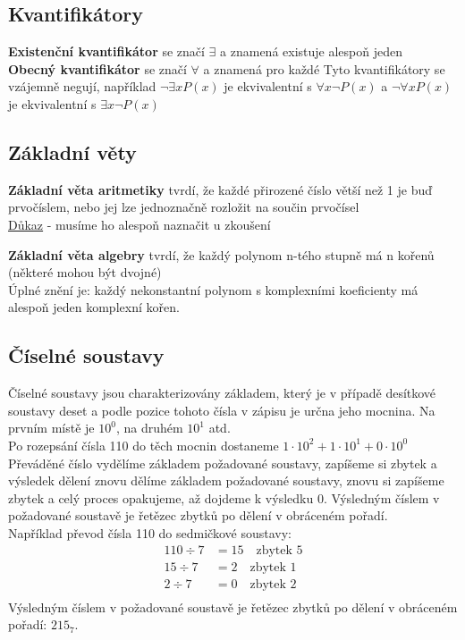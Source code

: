 \documentclass[12pt]{article}
\begin{document}
\subsection*{Kvantiﬁkátory}
\textbf{Existenční kvantifikátor} se značí $\exists$ a znamená existuje alespoň jeden\\
\textbf{Obecný kvantifikátor} se značí $\forall$ a znamená pro každé
Tyto kvantifikátory se vzájemně negují, například $\neg \exists x P(x)$ je ekvivalentní s $\forall x \neg P(x)$ a $\neg \forall x P(x)$ je ekvivalentní s $\exists x \neg P(x)$

\subsection*{Základní věty}
\textbf{Základní věta aritmetiky} tvrdí, že každé přirozené číslo větší než 1 je buď prvočíslem, nebo jej lze jednoznačně rozložit na součin prvočísel\\
\href{https://www.matweb.cz/zakladni-veta-aritmetiky/?value0=100&unit0=&outputUnit=}{\color{blue}Důkaz} - musíme ho alespoň naznačit u zkoušení

\textbf{Základní věta algebry} tvrdí, že každý polynom n-tého stupně má n kořenů (některé mohou být dvojné)\\
Úplné znění je: každý nekonstantní polynom s komplexními koeficienty má alespoň jeden komplexní kořen.\\

\subsection*{Číselné soustavy}
Číselné soustavy jsou charakterizovány základem, který je v případě desítkové soustavy deset a podle pozice tohoto čísla v zápisu je určna jeho mocnina. Na prvním místě je $10^0$, na druhém $10^1$ atd.\\
Po rozepsání čísla 110 do těch mocnin dostaneme $1 \cdot 10^2 + 1 \cdot 10^1 + 0 \cdot 10^0$\\ 
Převáděné číslo vydělíme základem požadované soustavy, zapíšeme si zbytek a výsledek dělení znovu dělíme základem požadované soustavy, znovu si zapíšeme zbytek a celý proces opakujeme, až dojdeme k výsledku 0. Výsledným číslem v požadované soustavě je řetězec zbytků po dělení v obráceném pořadí.\\
Například převod čísla 110 do sedmičkové soustavy:\\
\begin{align*}
110 \div 7 &= 15 \quad \text{zbytek } 5\\
15 \div 7 &= 2 \quad \text{zbytek } 1\\
2 \div 7 &= 0 \quad \text{zbytek } 2\\
\end{align*}
Výsledným číslem v požadované soustavě je řetězec zbytků po dělení v obráceném pořadí: $215_7$.
\end{document}
